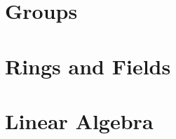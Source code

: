 \documentclass{article}
\theoremstyle{definition}
\begin{document}
	

\section{Groups}

	

	

	

	

	

	

	

\section{Rings and Fields}
	

	

	

	

	

	

	

\section{Linear Algebra}
	

	

	
	
	



\end{document}
